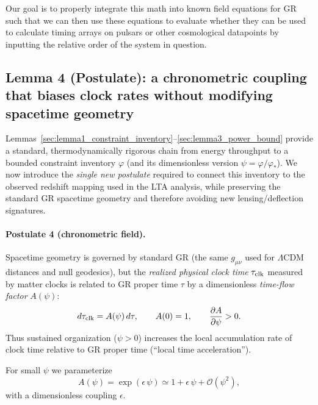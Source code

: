 \documentclass[10pt]{article}
\begin{document}
Our goal is to properly integrate this math into known
field equations for GR such that we can then use these equations to evaluate whether they can be
used to calculate timing arrays on pulsars or other cosmological datapoints by inputting the
relative order of the system in question.
\subsection{Lemma 4 (Postulate): a chronometric coupling that biases clock rates without modifying spacetime geometry}
\label{sec:lemma4_chronometric}

Lemmas~\ref{sec:lemma1_constraint_inventory}--\ref{sec:lemma3_power_bound} provide a standard,
thermodynamically rigorous chain from energy throughput to a bounded constraint inventory
$\varphi$ (and its dimensionless version $\psi=\varphi/\varphi_\ast$).
We now introduce the \emph{single new postulate} required to connect this inventory to the observed
redshift mapping used in the LTA analysis, while preserving the standard GR spacetime geometry and
therefore avoiding new lensing/deflection signatures.

\paragraph{Postulate 4 (chronometric field).}
Spacetime geometry is governed by standard GR (the same $g_{\mu\nu}$ used for $\Lambda$CDM distances
and null geodesics), but the \emph{realized physical clock time} $\tau_{\rm clk}$ measured by
matter clocks is related to GR proper time $\tau$ by a dimensionless \emph{time-flow factor}
$A(\psi)$:
\begin{equation}
d\tau_{\rm clk} = A(\psi)\,d\tau,
\qquad
A(0)=1,
\qquad
\frac{\partial A}{\partial \psi} > 0.
\label{eq:clock_factor_postulate}
\end{equation}
Thus sustained organization ($\psi>0$) increases the local accumulation rate of clock time relative
to GR proper time (``local time acceleration'').

For small $\psi$ we parameterize
\begin{equation}
A(\psi)=\exp(\epsilon\,\psi)\simeq 1+\epsilon\,\psi+\mathcal{O}(\psi^2),
\label{eq:A_of_psi}
\end{equation}
with a dimensionless coupling $\epsilon$.
\end{document}
